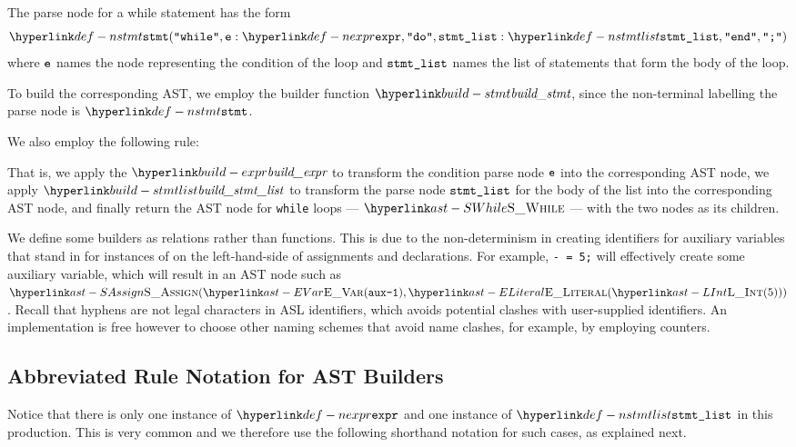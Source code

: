 The parse node for a while statement has the form
\[
\Nstmt(\Twhile, \namednode{\ve}{\Nexpr}, \Tdo, \namednode{\vstmtlist}{\Nstmtlist}, \Tend, \Tsemicolon)
\]
where $\ve$ names the node representing the condition of the loop and $\vstmtlist$ names
the list of statements that form the body of the loop.

To build the corresponding AST, we employ the builder function $\buildstmt$, since
the non-terminal labelling the parse node is $\Nstmt$.

We also employ the following rule:
\begin{mathpar}
\end{mathpar}
That is, we apply the $\buildexpr$ to transform the condition parse node $\ve$ into the corresponding AST node,
we apply $\buildstmtlist$ to transform the parse node $\vstmtlist$ for the body of the list into the corresponding AST node,
and finally return the AST node for \texttt{while} loops --- $\SWhile$ --- with the two nodes as its children.

We define some builders as relations rather than functions. This is due to the non-determinism
in creating identifiers for auxiliary variables that stand in for instances of \discardvar{} on the left-hand-side
of assignments and declarations.
For example, \texttt{- = 5;} will effectively create some auxiliary variable, which will result in
an AST node such as $\SAssign(\EVar(\texttt{aux-1}), \ELiteral(\LInt(5)))$.
Recall that hyphens are not legal characters in ASL identifiers, which avoids potential clashes with
user-supplied identifiers. An implementation is free however to choose other naming schemes that
avoid name clashes, for example, by employing counters.

\subsection{Abbreviated Rule Notation for AST Builders}
Notice that there is only one instance of $\Nexpr$ and one instance of $\Nstmtlist$ in this production.
This is very common and we therefore use the following shorthand notation for such cases, as explained next.


